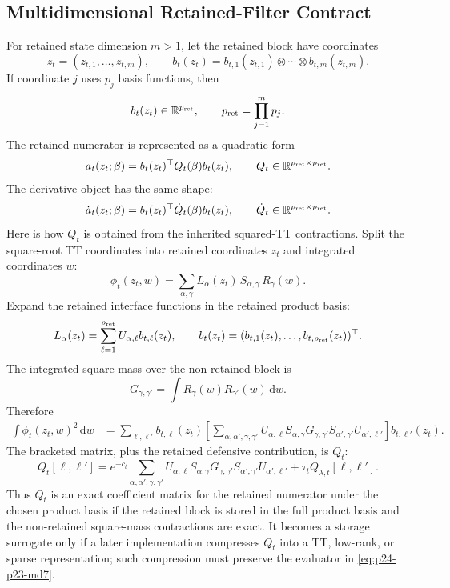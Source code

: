 \documentclass[11pt]{article}
\newcommand{\R}{\mathbb R}
\newcommand{\dd}{\,\mathrm d}
\begin{document}
\subsection*{Multidimensional Retained-Filter Contract}

For retained state dimension \(m>1\), let the retained block have coordinates
\[
    z_t=(z_{t,1},\ldots,z_{t,m}),
    \qquad
    b_t(z_t)=b_{t,1}(z_{t,1})\otimes\cdots\otimes b_{t,m}(z_{t,m}).
    \label{eq:p24-p23-md1}
\]
If coordinate \(j\) uses \(p_j\) basis functions, then
\[
    b_t(z_t)\in\R^{p_{\rm ret}},
    \qquad
    p_{\rm ret}=\prod_{j=1}^m p_j.
    \label{eq:p24-p23-md2}
\]
The retained numerator is represented as a quadratic form
\[
    a_t(z_t;\beta)
    =
    b_t(z_t)^\top Q_t(\beta)b_t(z_t),
    \qquad
    Q_t\in\R^{p_{\rm ret}\times p_{\rm ret}}.
    \label{eq:p24-p23-md3}
\]
The derivative object has the same shape:
\[
    \dot a_t(z_t;\beta)
    =
    b_t(z_t)^\top \dot Q_t(\beta)b_t(z_t),
    \qquad
    \dot Q_t\in\R^{p_{\rm ret}\times p_{\rm ret}}.
    \label{eq:p24-p23-md4}
\]
Here is how \(Q_t\) is obtained from the inherited squared-TT contractions.
Split the square-root TT coordinates into retained coordinates \(z_t\) and
integrated coordinates \(w\):
\[
    \phi_t(z_t,w)
    =
    \sum_{\alpha,\gamma}
    L_\alpha(z_t)\,S_{\alpha,\gamma}\,R_\gamma(w).
    \label{eq:p24-p23-md4a}
\]
Expand the retained interface functions in the retained product basis:
\[
    L_\alpha(z_t)
    =
    \sum_{\ell=1}^{p_{\rm ret}} U_{\alpha,\ell}b_{t,\ell}(z_t),
    \qquad
    b_t(z_t)=(b_{t,1}(z_t),\ldots,b_{t,p_{\rm ret}}(z_t))^\top.
    \label{eq:p24-p23-md4b}
\]
The integrated square-mass over the non-retained block is
\[
    G_{\gamma,\gamma'}
    =
    \int R_\gamma(w)R_{\gamma'}(w)\dd w.
    \label{eq:p24-p23-md4c}
\]
Therefore
\[
\begin{aligned}
    \int\phi_t(z_t,w)^2\dd w
    &=
    \sum_{\ell,\ell'}
    b_{t,\ell}(z_t)
    \left[
    \sum_{\alpha,\alpha',\gamma,\gamma'}
    U_{\alpha,\ell}S_{\alpha,\gamma}
    G_{\gamma,\gamma'}
    S_{\alpha',\gamma'}U_{\alpha',\ell'}
    \right]
    b_{t,\ell'}(z_t).
\end{aligned}
    \label{eq:p24-p23-md4d}
\]
The bracketed matrix, plus the retained defensive contribution, is \(Q_t\):
\[
    Q_t[\ell,\ell']
    =
    e^{-c_t}
    \sum_{\alpha,\alpha',\gamma,\gamma'}
    U_{\alpha,\ell}S_{\alpha,\gamma}
    G_{\gamma,\gamma'}
    S_{\alpha',\gamma'}U_{\alpha',\ell'}
    +
    \tau_t Q_{\lambda,t}[\ell,\ell'].
    \label{eq:p24-p23-md4e}
\]
Thus \(Q_t\) is an exact coefficient matrix for the retained numerator under
the chosen product basis if the retained block is stored in the full product
basis and the non-retained square-mass contractions are exact.  It becomes a
storage surrogate only if a later implementation compresses \(Q_t\) into a TT,
low-rank, or sparse representation; such compression must preserve the
evaluator in \eqref{eq:p24-p23-md7}.
\end{document}
